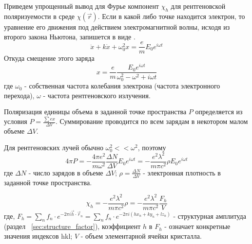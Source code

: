 \begin{center}
  \section{}%
\end{center}

\label{sec:polarizability}
Приведем упрощенный вывод для Фурье компонент  $\chi_h$  для рентгеновской
поляризуемости в среде  $\chi(\vec{r})$. Если в какой либо точке находится электрон,
то уравнение его движения под действием электромагнитной волны,
исходя из второго закона Ньютона, запишется в виде \cite{iveronova1972}.
\begin{equation}
  \ddot{x}+ k\dot{x} + \omega_0^2 x = \frac{e}{m}E_0e^{i\omega t}
 \end{equation}
Откуда смещение этого заряда
\begin{equation}
  x = \frac{e}{m} \frac{E_0e^{i\omega t}}{\omega_0^2 - \omega^2+i\omega t}
 \end{equation}
где $\omega_0 $ - собственная частота колебания электрона (частота электронного перехода), $\omega$ - частота рентгеновского излучения.

Поляризация единицы объема в заданной точке пространства $P$ определяется из условия
$P = \frac{\sum e x}{\Delta V}$. Суммирование проводится по всем зарядам в
некотором малом объеме  $\Delta V$.

Для рентгеновских лучей обычно $\omega_0^2 << \omega^2$, поэтому
\begin{equation}
  4\pi P = - \frac{4\pi e^2}{m\omega^2}\frac{\Delta N}{\Delta V} E_0 e^{i\omega t} = -\frac{e^2 \lambda^2}{m \pi c^2} \rho E_0 e^{i\omega t}
 \end{equation}
где $\Delta N$ - число зарядов в объеме $\Delta V$;
$\rho = \frac{\Delta N}{\Delta V}$ - электронная плотность в заданной точке пространства.


\begin{equation}
  \chi_h = -\frac{e^2 \lambda^2}{m \pi c^2}  \rho = -\frac{e^2 \lambda^2}{m \pi c^2} \frac{F_h}{V}
 \end{equation}
 где, $ F_h = \sum_{n} f_n \cdot e^{-2\pi i\vec{h}\cdot \vec{r}_n}= \sum_{n} f_n \cdot e^{- 2 \pi i (hx_n+ky_n+lz_n)}$ -
 структурная амплитуда (раздел ~\ref{sec:structure_factor}),
 коэффициент $h$ в $F_h$ - означает конкретные значения индексов {hkl}; $V$ - объем элементарной ячейки кристалла.

\newpage
\begin{center}
\section{}%
\end{center}

